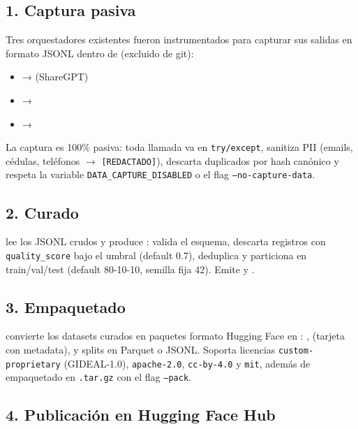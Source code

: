 \documentclass[12pt, a4paper]{article}
\begin{document}
\subsection{1. Captura pasiva}

Tres orquestadores existentes fueron instrumentados para capturar sus salidas en
formato JSONL dentro de  (excluido de git):

\begin{itemize}
    \item {} →  (ShareGPT)
    \item {} → 
    \item {} → 
\end{itemize}

La captura es 100\% pasiva: toda llamada va en \texttt{try/except}, sanitiza PII
(emails, cédulas, teléfonos $\rightarrow$ \texttt{[REDACTADO]}), descarta duplicados
por hash canónico y respeta la variable \texttt{DATA\_CAPTURE\_DISABLED} o el flag
\texttt{--no-capture-data}.

\subsection{2. Curado}

 lee los JSONL crudos y produce
: valida el esquema, descarta registros con
\texttt{quality\_score} bajo el umbral (default 0.7), deduplica y particiona en
train/val/test (default 80-10-10, semilla fija 42). Emite  y
.

\subsection{3. Empaquetado}

 convierte los datasets curados en paquetes
formato Hugging Face en : ,
 (tarjeta con metadata),  y splits en Parquet o JSONL.
Soporta licencias \texttt{custom-proprietary} (GIDEAL-1.0), \texttt{apache-2.0},
\texttt{cc-by-4.0} y \texttt{mit}, además de empaquetado en \texttt{.tar.gz}
con el flag \texttt{--pack}.

\subsection{4. Publicación en Hugging Face Hub}
\end{document}
